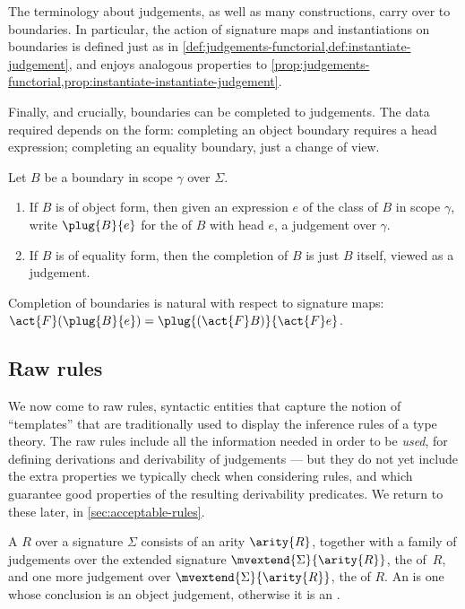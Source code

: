 The terminology about judgements, as well as many constructions, carry over to boundaries.
%
In particular, the action of signature maps and instantiations on boundaries is defined just as in \cref{def:judgements-functorial,def:instantiate-judgement}, and enjoys analogous properties to \cref{prop:judgements-functorial,prop:instantiate-instantiate-judgement}.

Finally, and crucially, boundaries can be completed to judgements.
%
The data required depends on the form: completing an object boundary requires a head expression; completing an equality boundary, just a change of view.
%
\begin{definition} \label{def:completion-boundary}
  Let $B$ be a boundary in scope $\gamma$ over $\Sigma$.
  \begin{enumerate}
  \item If $B$ is of object form, then given an expression $e$ of the class of $B$ in scope $\gamma$, write $\plug{B}{e}$ for the  of $B$ with head $e$, a judgement over $\gamma$.
  \item If $B$ is of equality form, then the completion of $B$ is just $B$ itself, viewed as a judgement.
  \end{enumerate}
\end{definition}

\begin{propositionwithqed}
  Completion of boundaries is natural with respect to signature maps: $\act{F}(\plug{B}{e}) = \plug{(\act{F}B)}{\act{F}e}$.
\end{propositionwithqed}

\subsection{Raw rules} \label{sec:raw-rules}

We now come to raw rules, syntactic entities that capture the notion of ``templates'' that are traditionally used to display the inference rules of a type theory.
%
The raw rules include all the information needed in order to be \emph{used}, for defining derivations and derivability of judgements --- but they do not yet include the extra properties we typically check when considering rules, and which guarantee good properties of the resulting derivability predicates.
%
We return to these later, in \cref{sec:acceptable-rules}.

\begin{definition}
  \label{def:raw-rule}%
  A  $R$ over a signature $\Sigma$ consists of an arity $\arity{R}$,
  together with a family of judgements over the extended signature $\mvextend{\Sigma}{\arity{R}}$, the  of~$R$,
  and one more judgement over $\mvextend{\Sigma}{\arity{R}}$, the  of $R$.
  An  is one whose conclusion is an object judgement, otherwise it is an .
\end{definition}

